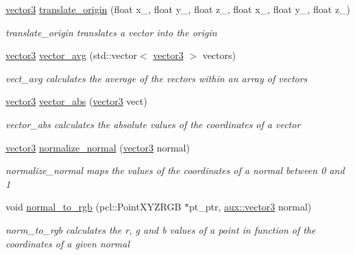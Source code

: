 \begin{DoxyCompactItemize}
\hyperlink{classcloud__object__segmentation_1_1aux_1_1vector3}{vector3} \hyperlink{namespacecloud__object__segmentation_1_1aux_a6064004fbb1cb4057191d67804ff4df4}{translate\+\_\+origin} (float x\+\_, float y\+\_, float z\+\_, float x\+\_, float y\+\_, float z\+\_)
\begin{DoxyCompactList}\small\item\em translate\+\_\+origin translates a vector into the origin \end{DoxyCompactList}\item 
\hyperlink{classcloud__object__segmentation_1_1aux_1_1vector3}{vector3} \hyperlink{namespacecloud__object__segmentation_1_1aux_a8a8fe6b426ed28820fbd1102eaf204c8}{vector\+\_\+avg} (std\+::vector$<$ \hyperlink{classcloud__object__segmentation_1_1aux_1_1vector3}{vector3} $>$ vectors)
\begin{DoxyCompactList}\small\item\em vect\+\_\+avg calculates the average of the vectors within an array of vectors \end{DoxyCompactList}\item 
\hyperlink{classcloud__object__segmentation_1_1aux_1_1vector3}{vector3} \hyperlink{namespacecloud__object__segmentation_1_1aux_a6d8f8292c05ff01191a1b0f62e48c173}{vector\+\_\+abs} (\hyperlink{classcloud__object__segmentation_1_1aux_1_1vector3}{vector3} vect)
\begin{DoxyCompactList}\small\item\em vector\+\_\+abs calculates the absolute values of the coordinates of a vector \end{DoxyCompactList}\item 
\hyperlink{classcloud__object__segmentation_1_1aux_1_1vector3}{vector3} \hyperlink{namespacecloud__object__segmentation_1_1aux_a88a6c55fd9d9769fea1898f101102c94}{normalize\+\_\+normal} (\hyperlink{classcloud__object__segmentation_1_1aux_1_1vector3}{vector3} normal)
\begin{DoxyCompactList}\small\item\em normalize\+\_\+normal maps the values of the coordinates of a normal between 0 and 1 \end{DoxyCompactList}\item 
void \hyperlink{namespacecloud__object__segmentation_1_1aux_ad2dd6bc1e223cf47809b8b86454466ba}{normal\+\_\+to\+\_\+rgb} (pcl\+::\+Point\+X\+Y\+Z\+R\+GB $\ast$pt\+\_\+ptr, \hyperlink{classcloud__object__segmentation_1_1aux_1_1vector3}{aux\+::vector3} normal)
\begin{DoxyCompactList}\small\item\em norm\+\_\+to\+\_\+rgb calculates the r, g and b values of a point in function of the coordinates of a given normal \end{DoxyCompactList}\end{DoxyCompactItemize}


